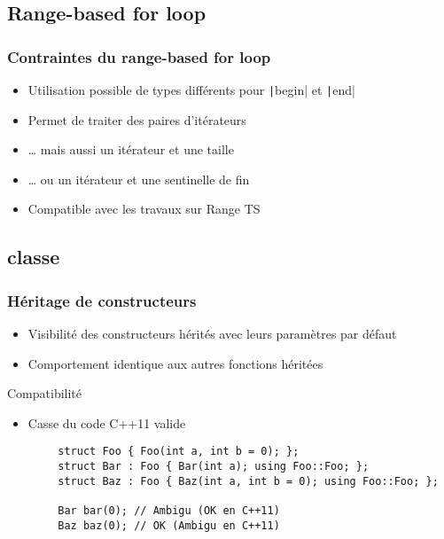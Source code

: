 \documentclass[C++.tex]{subfiles}
\begin{document}
\subsection*{Range-based for loop}
\begin{frame}[fragile]
	\frametitle{Contraintes du range-based for loop}
	\begin{itemize}
		\item Utilisation possible de types différents pour \texttt|begin| et \texttt|end|
		\item Permet de traiter des paires d'itérateurs
		\item \ldots{} mais aussi un itérateur et une taille
		\item \ldots{} ou un itérateur et une sentinelle de fin
		\item Compatible avec les travaux sur Range TS
	\end{itemize}

\end{frame}

\subsection*{classe}
\begin{frame}[fragile]
	\frametitle{Héritage de constructeurs}
	\begin{itemize}
		\item Visibilité des constructeurs hérités avec leurs paramètres par défaut


		\item Comportement identique aux autres fonctions héritées
	\end{itemize}


	\begin{alertblock}{Compatibilité}
		\begin{itemize}
			\item Casse du code C++11 valide
		\end{itemize}
	\end{alertblock}

	\begin{verbatim}
		struct Foo { Foo(int a, int b = 0); };
		struct Bar : Foo { Bar(int a); using Foo::Foo; };
		struct Baz : Foo { Baz(int a, int b = 0); using Foo::Foo; };

		Bar bar(0); // Ambigu (OK en C++11)
		Baz baz(0); // OK (Ambigu en C++11)
	\end{verbatim}

\end{frame}
\end{document}
